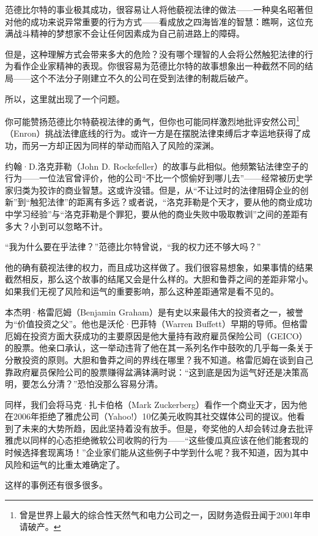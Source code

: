 范德比尔特的事业极其成功，很容易让人将他藐视法律的做法——一种臭名昭著但对他的成功来说异常重要的行为方式——看成放之四海皆准的智慧：瞧啊，这位充满战斗精神的梦想家不会让任何因素成为自己前进路上的障碍。

但是，这种理解方式会带来多大的危险？没有哪个理智的人会将公然触犯法律的行为看作企业家精神的表现。你很容易为范德比尔特的故事想象出一种截然不同的结局——这个不法分子刚建立不久的公司在受到法律的制裁后破产。

所以，这里就出现了一个问题。

你可能赞扬范德比尔特藐视法律的勇气，但你也可能同样激烈地批评安然公司\footnote{曾是世界上最大的综合性天然气和电力公司之一，因财务造假丑闻于2001年申请破产。}（Enron）挑战法律底线的行为。或许一方是在摆脱法律束缚后才幸运地获得了成功，而另一方却正因为同样的举动而陷入了风险的深渊。

约翰·D.洛克菲勒（John D. Rockefeller）的故事与此相似。他频繁钻法律空子的行为——一位法官曾评价，他的公司“不比一个惯偷好到哪儿去”——经常被历史学家归类为狡诈的商业智慧。这或许没错。但是，从“不让过时的法律阻碍企业的创新”到“触犯法律”的距离有多远？或者说，“洛克菲勒是个天才，要从他的商业成功中学习经验”与“洛克菲勒是个罪犯，要从他的商业失败中吸取教训”之间的差距有多大？小到可以忽略不计。

“我为什么要在乎法律？”范德比尔特曾说，“我的权力还不够大吗？”

他的确有藐视法律的权力，而且成功这样做了。我们很容易想象，如果事情的结果截然相反，那么这个故事的结尾又会是什么样的。大胆和鲁莽之间的差距非常小。如果我们无视了风险和运气的重要影响，那么这种差距通常是看不见的。

本杰明·格雷厄姆（Benjamin Graham）是有史以来最伟大的投资者之一，被誉为“价值投资之父”。他也是沃伦·巴菲特（Warren Buffett）早期的导师。但格雷厄姆在投资方面大获成功的主要原因是他大量持有政府雇员保险公司（GEICO）的股票。他亲口承认，这一举动违背了他在其一系列名作中鼓吹的几乎每一条关于分散投资的原则。大胆和鲁莽之间的界线在哪里？我不知道。格雷厄姆在谈到自己靠政府雇员保险公司的股票赚得盆满钵满时说：“这到底是因为运气好还是决策高明，要怎么分清？”恐怕没那么容易分清。

同样，我们会将马克·扎卡伯格（Mark Zuckerberg）看作一个商业天才，因为他在2006年拒绝了雅虎公司（Yahoo!）10亿美元收购其社交媒体公司的提议。他看到了未来的大势所趋，因此坚持着没有放手。但是，夸奖他的人却会转过身去批评雅虎以同样的心态拒绝微软公司收购的行为——“这些傻瓜真应该在他们能套现的时候选择套现离场！”企业家们能从这些例子中学到什么呢？我不知道，因为其中风险和运气的比重太难确定了。

这样的事例还有很多很多。

